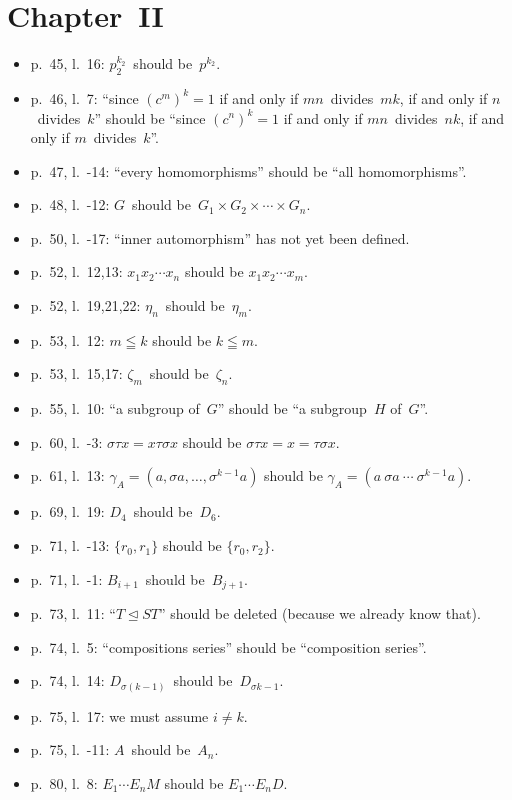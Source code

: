 \documentclass[letterpaper,12pt]{article}
\newcommand{\normal}{\trianglelefteq}
\begin{document}
\section*{Chapter~II}
\begin{itemize}
\item p.~45, l.~16: \(p_2^{k_2}\)~should be~\(p^{k_2}\).
\item p.~46, l.~7: ``since \((c^m)^k=1\) if and only if \(mn\)~divides~\(mk\), if and only if \(n\)~divides~\(k\)'' should be ``since \((c^n)^k=1\) if and only if \(mn\)~divides~\(nk\), if and only if \(m\)~divides~\(k\)''.
\item p.~47, l.~-14: ``every homomorphisms'' should be ``all homomorphisms''.
\item p.~48, l.~-12: \(G\)~should be~\(G_1\times G_2\times\cdots\times G_n\).
\item p.~50, l.~-17: ``inner automorphism'' has not yet been defined.
\item p.~52, l.~12,13: \(x_1x_2\cdots x_n\) should be \(x_1x_2\cdots x_m\).
\item p.~52, l.~19,21,22: \(\eta_n\)~should be~\(\eta_m\).
\item p.~53, l.~12: \(m\leqq k\) should be \(k\leqq m\).
\item p.~53, l.~15,17: \(\zeta_m\)~should be~\(\zeta_n\).
\item p.~55, l.~10: ``a subgroup of~\(G\)'' should be ``a subgroup~\(H\) of~\(G\)''.
\item p.~60, l.~-3: \(\sigma\tau x=x\tau\sigma x\) should be \(\sigma\tau x=x=\tau\sigma x\).
\item p.~61, l.~13: \(\gamma_A=(a,\sigma a,\ldots,\sigma^{k-1}a)\) should be \(\gamma_A=(a\ \sigma a\ \cdots\ \sigma^{k-1}a)\).
\item p.~69, l.~19: \(D_4\)~should be~\(D_6\).
\item p.~71, l.~-13: \(\{r_0,r_1\}\) should be \(\{r_0,r_2\}\).
\item p.~71, l.~-1: \(B_{i+1}\)~should be~\(B_{j+1}\).
\item p.~73, l.~11: ``\(T\normal ST\)'' should be deleted (because we already know that).
\item p.~74, l.~5: ``compositions series'' should be ``composition series''.
\item p.~74, l.~14: \(D_{\sigma(k-1)}\)~should be~\(D_{\sigma k-1}\).
\item p.~75, l.~17: we must assume \(i\ne k\).
\item p.~75, l.~-11: \(A\)~should be~\(A_n\).
\item p.~80, l.~8: \(E_1\cdots E_nM\) should be \(E_1\cdots E_n D\).

\end{itemize}
\end{document}

